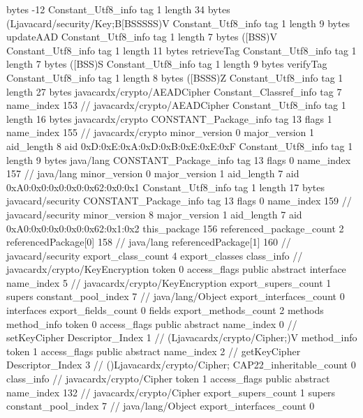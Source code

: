 {{{			bytes	-12
		}
		Constant_Utf8_info {
			tag	1
			length	34
			bytes	(Ljavacard/security/Key;B[BSSSSS)V
		}
		Constant_Utf8_info {
			tag	1
			length	9
			bytes	updateAAD
		}
		Constant_Utf8_info {
			tag	1
			length	7
			bytes	([BSS)V
		}
		Constant_Utf8_info {
			tag	1
			length	11
			bytes	retrieveTag
		}
		Constant_Utf8_info {
			tag	1
			length	7
			bytes	([BSS)S
		}
		Constant_Utf8_info {
			tag	1
			length	9
			bytes	verifyTag
		}
		Constant_Utf8_info {
			tag	1
			length	8
			bytes	([BSSS)Z
		}
		Constant_Utf8_info {
			tag	1
			length	27
			bytes	javacardx/crypto/AEADCipher
		}
		Constant_Classref_info {
			tag	7
			name_index	153		// javacardx/crypto/AEADCipher
		}
		Constant_Utf8_info {
			tag	1
			length	16
			bytes	javacardx/crypto
		}
		CONSTANT_Package_info {
			tag	13
			flags	1
			name_index	155		// javacardx/crypto
			minor_version	0
			major_version	1
			aid_length	8
			aid	0xD:0xE:0xA:0xD:0xB:0xE:0xE:0xF
		}
		Constant_Utf8_info {
			tag	1
			length	9
			bytes	java/lang
		}
		CONSTANT_Package_info {
			tag	13
			flags	0
			name_index	157		// java/lang
			minor_version	0
			major_version	1
			aid_length	7
			aid	0xA0:0x0:0x0:0x0:0x62:0x0:0x1
		}
		Constant_Utf8_info {
			tag	1
			length	17
			bytes	javacard/security
		}
		CONSTANT_Package_info {
			tag	13
			flags	0
			name_index	159		// javacard/security
			minor_version	8
			major_version	1
			aid_length	7
			aid	0xA0:0x0:0x0:0x0:0x62:0x1:0x2
		}
	}
	this_package	156
	referenced_package_count	2
	referencedPackage[0]	158		// java/lang
	referencedPackage[1]	160		// javacard/security
	export_class_count	4
	export_classes {
		class_info {		// javacardx/crypto/KeyEncryption
			token	0
			access_flags	public abstract interface
			name_index	5		// javacardx/crypto/KeyEncryption
			export_supers_count	1
			supers {
				constant_pool_index	7		// java/lang/Object
			}
			export_interfaces_count	0
			interfaces {
			}
			export_fields_count	0
			fields {
			}
			export_methods_count	2
			methods {
				method_info {
					token	0
					access_flags	public abstract
					name_index	0		// setKeyCipher
					Descriptor_Index	1		// (Ljavacardx/crypto/Cipher;)V
				}
				method_info {
					token	1
					access_flags	public abstract
					name_index	2		// getKeyCipher
					Descriptor_Index	3		// ()Ljavacardx/crypto/Cipher;
				}
			}
			CAP22_inheritable_count	0
		}
		class_info {		// javacardx/crypto/Cipher
			token	1
			access_flags	public abstract
			name_index	132		// javacardx/crypto/Cipher
			export_supers_count	1
			supers {
				constant_pool_index	7		// java/lang/Object
			}
			export_interfaces_count	0
}}}
